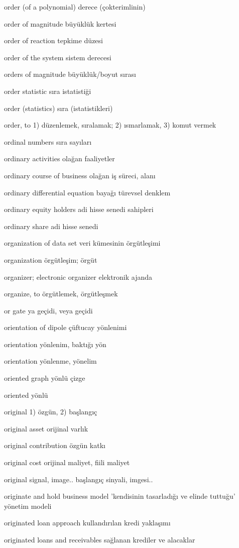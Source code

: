 \documentclass[12pt,fleqn]{article}\usepackage{../../common}
\begin{document}
order (of a polynomial) derece (çokterimlinin)

order of magnitude büyüklük kertesi

order of reaction tepkime düzesi

order of the system sistem derecesi

orders of magnitude büyüklük/boyut sırası

order statistic sıra istatistiği

order (statistics) sıra (istatistikleri)

order, to 1) düzenlemek, sıralamak; 2) ısmarlamak, 3) komut vermek

ordinal numbers sıra sayıları

ordinary activities olağan faaliyetler

ordinary course of business olağan iş süreci, alanı

ordinary differential equation bayağı türevsel denklem

ordinary equity holders adi hisse senedi sahipleri

ordinary share adi hisse senedi

organization of data set veri kümesinin örgütleşimi

organization örgütleşim; örgüt

organizer; electronic organizer elektronik ajanda

organize, to örgütlemek, örgütleşmek

or gate ya geçidi, veya geçidi

orientation of dipole çüftucay yönlenimi

orientation yönlenim, baktığı yön

orientation yönlenme, yönelim

oriented graph yönlü çizge

oriented yönlü

original 1) özgün, 2) başlangıç

original asset orijinal varlık

original contribution özgün katkı

original cost orijinal maliyet, fiili maliyet

original signal, image.. başlangıç sinyali, imgesi..

originate and hold business model 'kendisinin tasarladığı ve elinde tuttuğu' yönetim modeli

originated loan approach kullandırılan kredi yaklaşımı

originated loans and receivables sağlanan krediler ve alacaklar
\end{document}
